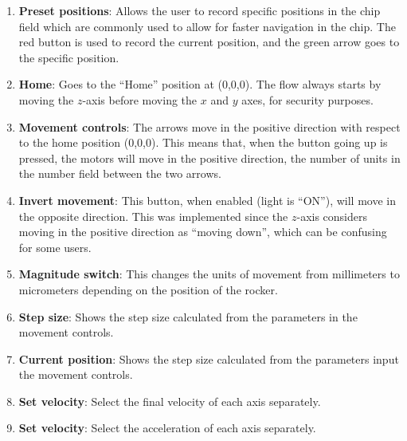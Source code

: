 \begin{enumerate}
\item \textbf{Preset positions}: Allows the user to record specific positions in the chip field which are commonly used to allow for faster navigation in the chip. The red button is used to record the current position, and the green arrow goes to the specific position. 
\item \textbf{Home}: Goes to the ``Home'' position at (0,0,0). The flow always starts by moving the $z$-axis before moving the $x$ and $y$ axes, for security purposes.
\item \textbf{Movement controls}: The arrows move in the positive direction with respect to the home position (0,0,0). This means that, when the button going up is pressed, the motors will move in the positive direction, the number of units in the number field between the two arrows. 
\item \textbf{Invert movement}: This button, when enabled (light is ``ON''), will move in the opposite direction. This was implemented since the $z$-axis considers moving in the positive direction as ``moving down'', which can be confusing for some users.
\item \textbf{Magnitude switch}: This changes the units of movement from millimeters to micrometers depending on the position of the rocker. 
\item \textbf{Step size}: Shows the step size calculated from the parameters in the movement controls.
\item \textbf{Current position}: Shows the step size calculated from the parameters input the movement controls.
\item \textbf{Set velocity}: Select the final velocity of each axis separately.
\item \textbf{Set velocity}: Select the acceleration of each axis separately.
\end{enumerate}